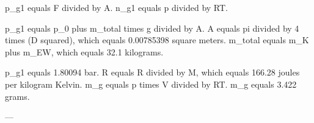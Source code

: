 p_g1 equals F divided by A.  
n_g1 equals p divided by RT.  

p_g1 equals p_0 plus m_total times g divided by A.  
A equals pi divided by 4 times (D squared), which equals 0.00785398 square meters.  
m_total equals m_K plus m_EW, which equals 32.1 kilograms.  

p_g1 equals 1.80094 bar.  
R equals R divided by M, which equals 166.28 joules per kilogram Kelvin.  
m_g equals p times V divided by RT.  
m_g equals 3.422 grams.  

---